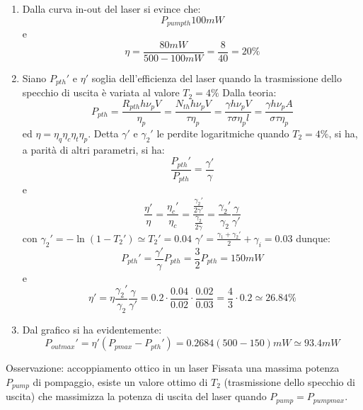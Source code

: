 \documentclass{book}
\def \s {\sigma}
\theoremstyle{remark}
\begin{document}
\begin{enumerate}
\begin{enumerate}
\item Dalla curva in-out del laser si evince che:
\begin{equation*}
P_{pump th} 100 mW
\end{equation*}
e
\begin{equation*}
\eta = \frac{80 mW}{500 -100 mW} = \frac{8}{40} = 20\%
\end{equation*}

\item Siano $P_{p th}'$ e $\eta'$ soglia dell'efficienza del laser quando la trasmissione dello specchio di uscita è variata al valore $T_2 = 4\%$
Dalla teoria:
\begin{equation*}
P_{p th} = \frac{R_{p th} h\nu_p V}{\eta_p} = \frac{N_{th} h\nu_p V}{\tau \eta_p} = \frac{\gamma h\nu_p V}{\tau \s \eta_p l} = \frac{\gamma h\nu_p A}{\s \tau \eta_p}
\end{equation*}
ed $\eta = \eta_q\eta_c\eta_t\eta_p$.
Detta $\gamma'$ e $\gamma_2'$ le perdite logaritmiche quando $T_2 = 4\%$, si ha, a parità di altri parametri, si ha:
\begin{equation*}
\frac{P_{p th}'}{P_{p th}} = \frac{\gamma'}{\gamma}
\end{equation*}
e
\begin{equation*}
\frac{\eta'}{\eta} = \frac{\eta_c'}{\eta_c} = \frac{\frac{\gamma_2'}{2\gamma'}}{\frac{\gamma_2}{2\gamma}} = \frac{\gamma_2'}{\gamma_2} \frac{\gamma}{\gamma'}
\end{equation*}
con $\gamma_2' = - \ln (1-T_2') \simeq T_2' = 0.04$ $\gamma' = \frac{\gamma_1 + \gamma_2'}{2} + \gamma_i = 0.03$
dunque:
\begin{equation*}
P_{p th}' = \frac{\gamma'}{\gamma} P_{p th} = \frac{3}{2} P_{p th} = 150 mW
\end{equation*}
e
\begin{equation*}
\eta' = \eta \frac{\gamma_2'}{\gamma_2} \frac{\gamma}{\gamma'} = 0.2\cdot \frac{0.04}{0.02} \cdot \frac{0.02}{0.03} = \frac{4}{3} \cdot 0.2 \simeq 26.84\%
\end{equation*}
\item %
Dal grafico si ha evidentemente:
\begin{equation*}
P_{out max}' = \eta'(P_{p max} - P_{p th}') = 0.2684 (500 -150) mW \simeq 93.4 mW
\end{equation*}
\end{enumerate}

Osservazione: accoppiamento ottico in un laser
Fissata una massima potenza $P_{pump}$ di pompaggio, esiste un valore ottimo di $T_2$ (trasmissione dello specchio di uscita) che massimizza la potenza di uscita del laser quando $P_{pump} = P_{pump max}$.


\end{enumerate}
\end{document}
